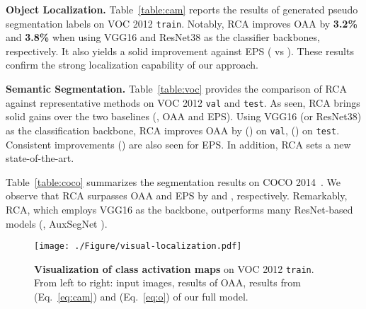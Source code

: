 \documentclass[10pt,twocolumn,letterpaper]{article}
\newcommand{\baseline}[1]{\color{ggray}{\scriptsize{{#1}}}}
\newcommand{\tablestyle}[2]{\setlength{\tabcolsep}{#1}\renewcommand{\arraystretch}{#2}\centering\footnotesize}
\begin{document}
\noindent\textbf{Object Localization.} Table~\ref{table:cam} reports the results of generated pseudo segmentation labels on  VOC 2012 \texttt{train}. Notably, RCA improves OAA by \textbf{3.2\%} and {\textbf{3.8\%}} when using VGG16 and ResNet38 as the classifier backbones, respectively. It also yields a solid improvement against EPS ( vs ). These results confirm the strong localization capability of our approach.




\noindent\textbf{Semantic Segmentation.} Table~\ref{table:voc} provides the comparison of RCA against representative methods on VOC 2012 \texttt{val} and \texttt{test}. As seen, RCA  brings solid gains over the two baselines (\ie, OAA and EPS). Using VGG16 (or ResNet38) as the classification backbone, RCA improves OAA by {} ({}) on \texttt{val},  {} ({}) on \texttt{test}. Consistent improvements ({}) are also seen  for EPS. In addition, RCA{\baseline{+EPS}} sets a new state-of-the-art.




Table~\ref{table:coco} summarizes the segmentation results on  {COCO 2014}~\cite{lin2014microsoft}. We observe that RCA surpasses  OAA and EPS  by {}  and {}, respectively. Remarkably, RCA{\baseline{+EPS}}, which employs VGG16 as the backbone, outperforms many ResNet-based models (\eg, AuxSegNet \cite{xu2021leveraging}).


\begin{figure}[t]
	\centering
	\texttt{[image: ./Figure/visual-localization.pdf]}
	\vspace{-18pt}
	\captionsetup{font=small}
	\caption{\small\textbf{Visualization of class activation maps} on VOC 2012 \texttt{train}. From left to right: input images, results of OAA, results from  (Eq.~\ref{eq:cam}) and  (Eq.~\ref{eq:o}) of our full model.}
	\label{fig:cam}
	\vspace{-6pt}
\end{figure}


\newcommand{\std}[1]{{\fontsize{5pt}{1em}\selectfont ~~}}
\newcommand{\res}[3]{
	\tablestyle{1pt}{1}
	\begin{tabular}{z{16}y{18}}
		{#1} &
		\fontsize{7.5pt}{1em}\selectfont{~({{#3}})}
\end{tabular}}
\end{document}
